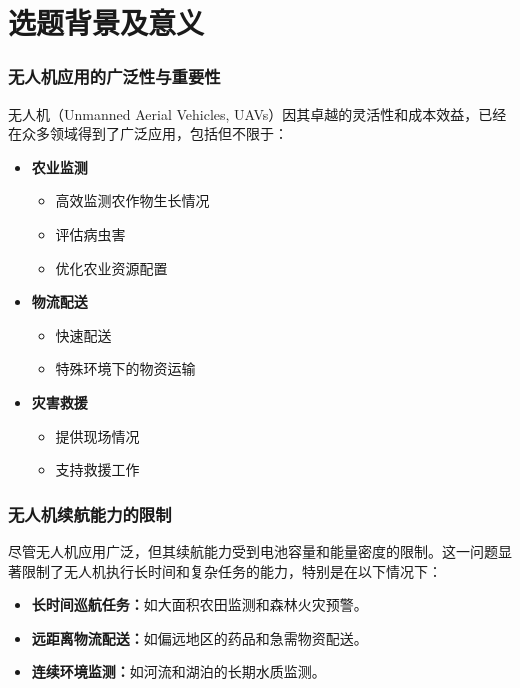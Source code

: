 

\section{选题背景及意义}

\begin{frame}[fragile]
  \frametitle{无人机应用的广泛性与重要性}

  无人机（Unmanned Aerial Vehicles, UAVs）因其卓越的灵活性和成本效益，已经在众多领域得到了广泛应用，包括但不限于：

  \begin{itemize}
    \item \textbf{农业监测}
    \begin{itemize}
      \item 高效监测农作物生长情况
      \item 评估病虫害
      \item 优化农业资源配置
    \end{itemize}

    \item \textbf{物流配送}
    \begin{itemize}
      \item 快速配送
      \item 特殊环境下的物资运输
    \end{itemize}

    \item \textbf{灾害救援}
    \begin{itemize}
      \item 提供现场情况
      \item 支持救援工作
    \end{itemize}
  \end{itemize}
  
\end{frame}

\begin{frame}[fragile]
  \frametitle{无人机续航能力的限制}
  尽管无人机应用广泛，但其续航能力受到电池容量和能量密度的限制。这一问题显著限制了无人机执行长时间和复杂任务的能力，特别是在以下情况下：
  \begin{itemize}
    \item \textbf{长时间巡航任务：}如大面积农田监测和森林火灾预警。
    \item \textbf{远距离物流配送：}如偏远地区的药品和急需物资配送。
    \item \textbf{连续环境监测：}如河流和湖泊的长期水质监测。
  \end{itemize}
\end{frame}

